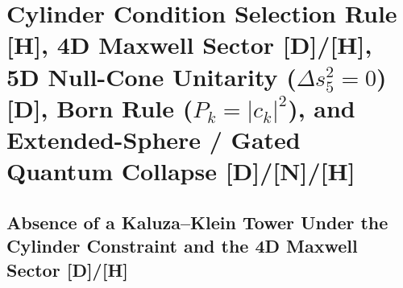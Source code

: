 \documentclass[11pt,a4paper]{article}
\newcommand{\catD}{\textbf{\textcolor{blue!75!black}{[D]}}}
\newcommand{\catH}{\textbf{\textcolor{orange!85!black}{[H]}}}
\newcommand{\catN}{\textbf{\textcolor{teal!75!black}{[N]}}}
\theoremstyle{definition}
\theoremstyle{remark}
\begin{document}
\section{\texorpdfstring{Cylinder Condition Selection Rule \catH, 4D Maxwell Sector \catD/\catH, 5D Null-Cone Unitarity ($\Delta s_5^2 = 0$) \catD, Born Rule ($P_k = |c_k|^2$), and Extended-Sphere / Gated Quantum Collapse \catD/\catN/\catH}{Cylinder Condition Selection Rule, 4D Maxwell Sector, 5D Null-Cone Unitarity, Born Rule, and Extended-Sphere / Gated Quantum Collapse}}

\subsection{\texorpdfstring{Absence of a Kaluza--Klein Tower Under the Cylinder Constraint and the 4D Maxwell Sector \catD/\catH}{Absence of a Kaluza-Klein Tower Under the Cylinder Constraint and the 4D Maxwell Sector}}
\end{document}
